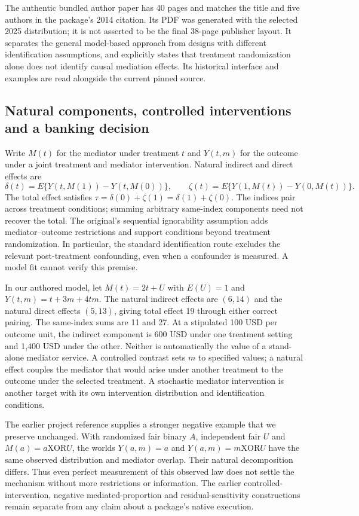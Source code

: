 The authentic bundled author paper has 40 pages and matches the title and five
authors in the package's 2014 citation. Its PDF was generated with the selected
2025 distribution; it is not asserted to be the final 38-page publisher layout.
It separates the general model-based approach from designs with different
identification assumptions, and explicitly states that treatment randomization
alone does not identify causal mediation effects. Its historical interface and
examples are read alongside the current pinned source.
\citep{exec24_mediation_original}

\subsection{Natural components, controlled interventions and a banking decision}
Write $M(t)$ for the mediator under treatment $t$ and $Y(t,m)$ for the outcome
under a joint treatment and mediator intervention. Natural indirect and direct
effects are
\[
 \delta(t)=E\{Y(t,M(1))-Y(t,M(0))\},\qquad
 \zeta(t)=E\{Y(1,M(t))-Y(0,M(t))\}.
\]
The total effect satisfies $\tau=\delta(0)+\zeta(1)=\delta(1)+\zeta(0)$.
The indices pair across treatment conditions; summing arbitrary same-index
components need not recover the total. The original's sequential ignorability
assumption adds mediator--outcome restrictions and support conditions beyond
treatment randomization. In particular, the standard identification route
excludes the relevant post-treatment confounding, even when a confounder is
measured. A model fit cannot verify this premise.
\citep{exec24_mediation_original}

In our authored model, let $M(t)=2t+U$ with $E(U)=1$ and
$Y(t,m)=t+3m+4tm$. The natural indirect effects are $(6,14)$ and the natural
direct effects $(5,13)$, giving total effect 19 through either correct pairing.
The same-index sums are 11 and 27. At a stipulated 100 USD per outcome unit,
the indirect component is 600 USD under one treatment setting and 1,400 USD
under the other. Neither is automatically the value of a stand-alone mediator
service. A controlled contrast sets $m$ to specified values; a natural effect
couples the mediator that would arise under another treatment to the outcome
under the selected treatment. A stochastic mediator intervention is another
target with its own intervention distribution and identification conditions.
\citep{exec24_mediation_contract}

The earlier project reference supplies a stronger negative example that we
preserve unchanged. With randomized fair binary $A$, independent fair $U$ and
$M(a)=a\mathbin{\mathrm{XOR}}U$, the worlds $Y(a,m)=a$ and
$Y(a,m)=m\mathbin{\mathrm{XOR}}U$ have the same observed distribution and
mediator overlap. Their natural decomposition differs. Thus even perfect
measurement of this observed law does not settle the mechanism without more
restrictions or information. The earlier controlled-intervention, negative
mediated-proportion and residual-sensitivity constructions remain separate
from any claim about a package's native execution.
\citep{exec20_med_reference}

